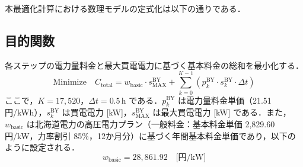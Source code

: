 \documentclass[a4paper,11pt,dvipdfmx]{jsarticle}
\begin{document}
本最適化計算における数理モデルの定式化は以下の通りである．

\subsection{目的関数}
各ステップの電力量料金と最大買電電力に基づく基本料金の総和を最小化する．
\begin{equation}
    \text{Minimize} \quad C_{\mathrm{total}} = w_{\mathrm{basic}} \cdot s^{\mathrm{BY}}_{\mathrm{MAX}} + \sum_{k=0}^{K-1} \left( p^{\mathrm{BY}}_{k} \cdot s^{\mathrm{BY}}_{k} \cdot \Delta t \right)
\end{equation}
ここで，$K = 17,520$，$\Delta t = 0.5$\,h である．$p^{\mathrm{BY}}_{k}$ は電力量料金単価（21.51\,円/kWh），$s^{\mathrm{BY}}_{k}$ は買電電力 [kW]，$s^{\mathrm{BY}}_{\mathrm{MAX}}$ は最大買電電力 [kW] である．また，$w_{\mathrm{basic}}$ は北海道電力の高圧電力プラン（一般料金：基本料金単価 2,829.60\,円/kW，力率割引 85\%，12か月分）に基づく年間基本料金単価であり，以下のように設定される．
\begin{equation}
    w_{\mathrm{basic}} = 28,861.92 \quad \text{[円/kW]}
\end{equation}
\end{document}
